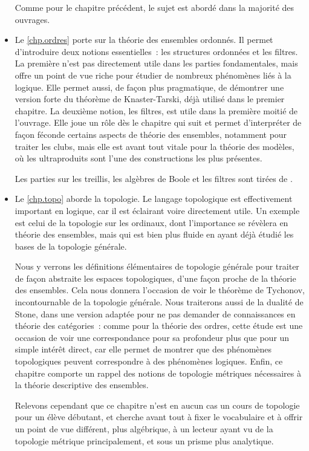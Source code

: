 \begin{itemize}
  Comme pour le chapitre précédent, le sujet est abordé dans la majorité des
  ouvrages.
\item Le \cref{chp.ordres} porte sur la théorie des ensembles ordonnés. Il
  permet d'introduire deux notions essentielles~: les structures ordonnées et
  les filtres. La première n'est pas directement utile dans les parties
  fondamentales, mais offre un point de vue riche pour étudier de nombreux
  phénomènes liés à la logique. Elle permet aussi, de façon plus pragmatique, de
  démontrer une version forte du théorème de Knaster-Tarski, déjà utilisé dans
  le premier chapitre. La deuxième notion, les filtres, est utile dans la
  première moitié de l'ouvrage. Elle joue un rôle dès le chapitre qui suit et
  permet d'interpréter de façon féconde certains aspects de théorie des
  ensembles, notamment pour traiter les clubs, mais elle est avant tout
  vitale pour la théorie des modèles, où les ultraproduits sont l'une des
  constructions les plus présentes.

  Les parties sur les treillis, les algèbres de Boole et les filtres sont tirées
  de \cite{cori2003logique}.
\item Le \cref{chp.topo} aborde la topologie. Le langage topologique est
  effectivement important en logique, car il est éclairant voire directement
  utile. Un exemple est celui de la topologie sur les ordinaux, dont
  l'importance se révèlera en théorie des ensembles, mais qui est bien plus
  fluide en ayant déjà étudié les bases de la topologie générale.

  Nous y verrons les définitions élémentaires de topologie générale pour traiter
  de façon abstraite les espaces topologiques, d'une façon proche de la théorie
  des ensembles. Cela nous donnera l'occasion de voir le théorème de Tychonov,
  incontournable de la topologie générale. Nous traiterons aussi de la dualité
  de Stone, dans une version adaptée pour ne pas demander de connaissances en
  théorie des catégories~: comme pour la théorie des ordres, cette étude est une
  occasion de voir une correspondance pour sa profondeur plus que pour un simple
  intérêt direct, car elle permet de montrer que des phénomènes topologiques
  peuvent correspondre à des phénomènes logiques. Enfin, ce chapitre comporte un
  rappel des notions de topologie métriques nécessaires à la théorie descriptive
  des ensembles.

  Relevons cependant que ce chapitre n'est en aucun cas un cours de topologie
  pour un élève débutant, et cherche avant tout à fixer le vocabulaire et à
  offrir un point de vue différent, plus algébrique, à un lecteur ayant vu de la
  topologie métrique principalement, et sous un prisme plus analytique.


\end{itemize}

